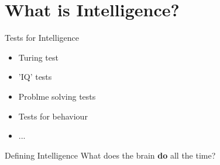 \section{What is Intelligence?}


\begin{frame}[c]{Tests for Intelligence}
    \Large
    \begin{itemize}[<+(1)->]
        \item Turing test
        \item 'IQ' tests
        \item Problme solving tests
        \item Tests for behaviour
        \item ...
    \end{itemize}
\end{frame}


\begin{frame}[c]{Defining Intelligence}
    \pause
    \Huge
    What does the brain \textbf{do} \newline all the time?

    \vfill

    \phantom{Predict. Learn.}
\end{frame}


